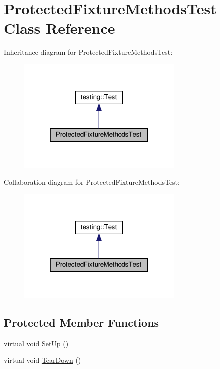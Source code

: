 \hypertarget{class_protected_fixture_methods_test}{}\section{Protected\+Fixture\+Methods\+Test Class Reference}
\label{class_protected_fixture_methods_test}


Inheritance diagram for Protected\+Fixture\+Methods\+Test\+:
\nopagebreak
\begin{figure}[H]
\begin{center}
\leavevmode
\includegraphics[width=226pt]{class_protected_fixture_methods_test__inherit__graph}
\end{center}
\end{figure}


Collaboration diagram for Protected\+Fixture\+Methods\+Test\+:
\nopagebreak
\begin{figure}[H]
\begin{center}
\leavevmode
\includegraphics[width=226pt]{class_protected_fixture_methods_test__coll__graph}
\end{center}
\end{figure}
\subsection*{Protected Member Functions}
\begin{DoxyCompactItemize}
\item 
virtual void \hyperlink{class_protected_fixture_methods_test_a5184c708ac89cfb69f0e4c742e93398a}{Set\+Up} ()
\item 
virtual void \hyperlink{class_protected_fixture_methods_test_aa143dff0a99903cde207b6fd0042c03c}{Tear\+Down} ()
\end{DoxyCompactItemize}
